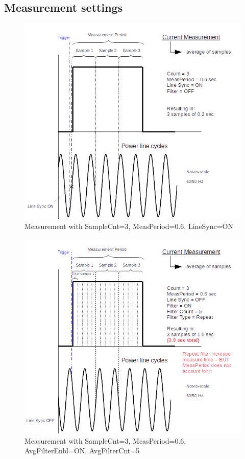 \documentclass[openany]{article}
\begin{document}
	\subsection{Measurement settings}\label{measurement-settings}

		\begin{figure}[!h]
			\caption{Measurement with SampleCnt=3, MeasPeriod=0.6, LineSync=ON}
			\label{fig:meas-param1}
			\centering
			\includegraphics[width=1.0\textwidth]{dcct-meas-param1}
		\end{figure}

		\begin{figure}[!h]
			\caption{Measurement with SampleCnt=3, MeasPeriod=0.6, AvgFilterEnbl=ON, AvgFilterCnt=5}
			\label{fig:meas-param2}
			\centering
			\includegraphics[width=1.0\textwidth]{dcct-meas-param2}
		\end{figure}
\FloatBarrier
\end{document}
